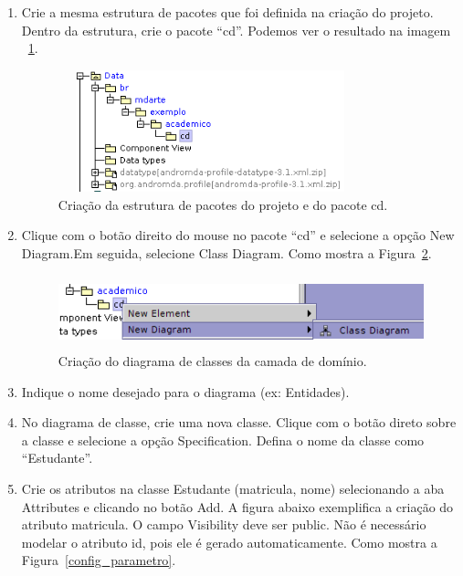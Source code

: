 \begin{enumerate}
\item Crie a mesma estrutura de pacotes que foi definida na criação do projeto.
Dentro da estrutura, crie o pacote “cd”. Podemos ver o resultado na imagem
~\ref{cria_estrutura_pacotes}. 
\begin{figure}[!htb]
	\centering
	\includegraphics[width=250pt,height=100pt]{imgs/tutorial-mdarte-0000.png}
	\caption{Criação da estrutura de pacotes do projeto e do pacote cd.}
	\label{cria_estrutura_pacotes}
\end{figure}
\item Clique com o botão direito do mouse no pacote “cd” e selecione a opção New
Diagram.Em seguida, selecione Class Diagram. Como mostra a
Figura~\ref{cria_diagrama_classe}.
\begin{figure}[!htb]
	\centering
	\includegraphics[width=400pt,height=60pt]{imgs/tutorial-mdarte-0001.png}
	\caption{Criação do diagrama de classes da camada de domínio.}
	\label{cria_diagrama_classe}
\end{figure}
	
\item Indique o nome desejado para o diagrama (ex: Entidades).
	
\item No diagrama de classe, crie uma nova classe. Clique com o botão direto
sobre a classe e selecione a opção Specification. Defina o nome da classe como
“Estudante”.
	
\item Crie os atributos na classe Estudante (matricula, nome) selecionando a aba
Attributes e clicando no botão Add. A figura abaixo exemplifica a criação do
atributo matricula. O campo Visibility deve ser public. Não é necessário modelar
o atributo id, pois ele é gerado automaticamente. Como mostra a
Figura~\ref{config_parametro}.


\end{enumerate}
